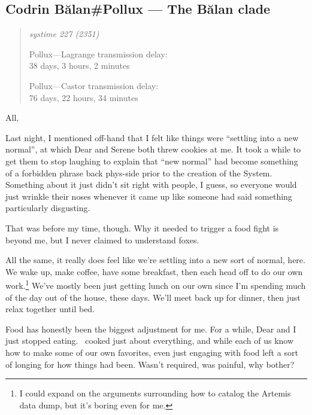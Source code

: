 \hypertarget{codrin-bux103lanpollux-the-bux103lan-clade}{%
\subsection{Codrin Bălan\#Pollux — The Bălan clade}\label{codrin-bux103lanpollux-the-bux103lan-clade}}

\begin{quote}
\itshape
systime 227 (2351)

Pollux---Lagrange transmission delay:\\
38 days, 3 hours, 2 minutes

Pollux---Castor transmission delay:\\
76 days, 22 hours, 34 minutes
\end{quote}

All,

Last night, I mentioned off-hand that I felt like things were ``settling into a new normal'', at which Dear and Serene both threw cookies at me. It took a while to get them to stop laughing to explain that ``new normal'' had become something of a forbidden phrase back phys-side prior to the creation of the System. Something about it just didn't sit right with people, I guess, so everyone would just wrinkle their noses whenever it came up like someone had said something particularly disgusting.

That was before my time, though. Why it needed to trigger a food fight is beyond me, but I never claimed to understand foxes.

All the same, it really does feel like we're settling into a new sort of normal, here. We wake up, make coffee, have some breakfast, then each head off to do our own work.\footnote{I could expand on the arguments surrounding how to catalog the Artemis data dump, but it's boring even for me.} We've mostly been just getting lunch on our own since I'm spending much of the day out of the house, these days. We'll meet back up for dinner, then just relax together until bed.

Food has honestly been the biggest adjustment for me. For a while, Dear and I just stopped eating. \Partner\ cooked just about everything, and while each of us know how to make some of our own favorites, even just engaging with food left a sort of longing for how things had been. Wasn't required, was painful, why bother?

